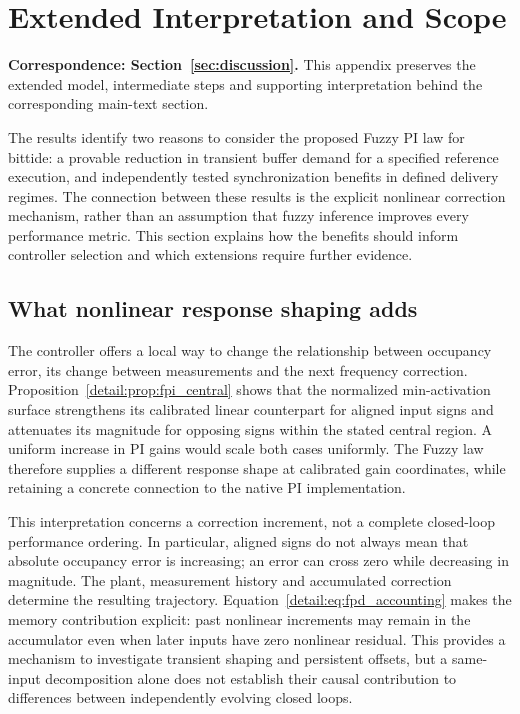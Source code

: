\section{Extended Interpretation and Scope}
\label{app:discussion}
\noindent\textbf{Correspondence: Section~\ref{sec:discussion}.} This appendix preserves the extended model, intermediate steps and supporting interpretation behind the corresponding main-text section.


\label{detail:sec:discussion}

The results identify two reasons to consider the proposed Fuzzy PI law
for bittide: a provable reduction in transient buffer demand for a
specified reference execution, and independently tested synchronization
benefits in defined delivery regimes. The connection between these
results is the explicit nonlinear correction mechanism, rather than
an assumption that fuzzy inference improves every performance metric.
This section explains how the benefits should inform controller
selection and which extensions require further evidence.

\subsection{What nonlinear response shaping adds}
\label{detail:subsec:discussion_mechanism}

The controller offers a local way to change the relationship between
occupancy error, its change between measurements and the next frequency
correction. Proposition~\ref{detail:prop:fpi_central} shows that the normalized
min-activation surface strengthens its calibrated linear counterpart
for aligned input signs and attenuates its magnitude for opposing signs
within the stated central region. A uniform increase in PI gains would
scale both cases uniformly. The Fuzzy law therefore supplies
a different response shape at calibrated gain coordinates, while
retaining a concrete connection to the native PI implementation.

This interpretation concerns a correction increment, not a complete
closed-loop performance ordering. In particular, aligned signs do not
always mean that absolute occupancy error is increasing; an error can
cross zero while decreasing in magnitude. The plant, measurement
history and accumulated correction determine the resulting trajectory.
Equation~\eqref{detail:eq:fpd_accounting} makes the memory contribution explicit:
past nonlinear increments may remain in the accumulator even when
later inputs have zero nonlinear residual. This provides a mechanism
to investigate transient shaping and persistent offsets, but a
same-input decomposition alone does not establish their causal
contribution to differences between independently evolving closed loops.

